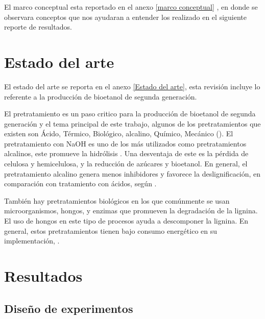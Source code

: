 \documentclass[12pt]{article}
\begin{document}
	
	
	El marco conceptual esta reportado en el anexo	\ref{marco conceptual} , en donde se observara conceptos que nos ayudaran a entender los realizado en el siguiente reporte de resultados.
	
	

	\section{Estado del arte}

	El estado del arte se reporta en el anexo \ref{Estado del arte}, esta revisión incluye lo referente a la producción de bioetanol de segunda generación.
	
	El pretratamiento es un paso critico para la producción de bioetanol de segunda generación y el tema principal de este trabajo, algunos de los pretratamientos que existen son Ácido, Térmico, Biológico, alcalino, Químico, Mecánico (\cite{ADITIYA2016631}).
	El pretratamiento con NaOH es uno de los más utilizados como pretratamientos alcalinos, este promueve la hidrólisis \cite{espinosa2021pretratamiento}. Una desventaja de este es la pérdida de celulosa y hemicelulosa, y la reducción de azúcares y bioetanol.
	En general, el pretratamiento alcalino genera menos inhibidores y favorece la deslignificación, en comparación con tratamiento con ácidos, según \cite{valles2022estudio}. 
	
	También hay pretratamientos biológicos en los que comúnmente se usan microorganismos, hongos, y enzimas que promueven la degradación de la lignina. El uso de hongos en este tipo de procesos ayuda a descomponer la lignina. En general, estos pretratamientos tienen bajo consumo energético en su implementación, \cite{Gonzalez2018desarrollo}. 
	
	\section{Resultados}
	
	\subsection{Diseño de experimentos}
	
\end{document}
